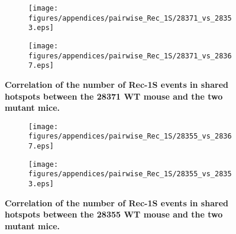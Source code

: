 \begin{figure}[h!]
    \centering
    \begin{subfigure}[b]{0.75\textwidth}
        \texttt{[image: figures/appendices/pairwise\_Rec\_1S/28371\_vs\_28353.eps]}
    \end{subfigure}

    \vspace{0.5cm}

    \begin{subfigure}[b]{0.75\textwidth}
        \texttt{[image: figures/appendices/pairwise\_Rec\_1S/28371\_vs\_28367.eps]}
    \end{subfigure}

	\caption[Correlation of the number of Rec-1S events in shared hotspots between the 28371 WT mouse and the two mutant mice]
    {\textbf{Correlation of the number of Rec-1S events in shared hotspots between the 28371 WT mouse and the two mutant mice.}
    }
\label{fig:pairwise-RR-shared-Rec1S-2}
\end{figure}




\begin{figure}[h!]
    \centering
   
	\begin{subfigure}[b]{0.75\textwidth}
        \texttt{[image: figures/appendices/pairwise\_Rec\_1S/28355\_vs\_28367.eps]}
    \end{subfigure}

    \vspace{0.5cm}
    
	\begin{subfigure}[b]{0.75\textwidth}
        \texttt{[image: figures/appendices/pairwise\_Rec\_1S/28355\_vs\_28353.eps]}
    \end{subfigure}


    \caption[Correlation of the number of Rec-1S events in shared hotspots between the 28355 WT mouse and the two mutant mice]
    {\textbf{Correlation of the number of Rec-1S events in shared hotspots between the 28355 WT mouse and the two mutant mice.}
    }
\label{fig:pairwise-RR-shared-Rec1S-3}
\end{figure}










